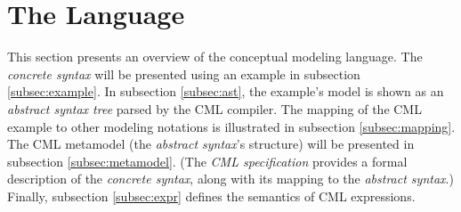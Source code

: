 \section{The Language}\label{sec:lang}
%
This section presents an overview of the conceptual modeling language.
The \emph{concrete syntax} will be presented using an example in subsection \ref{subsec:example}. 
In subsection \ref{subsec:ast},
the example's model is shown as an \emph{abstract syntax tree} parsed by the CML compiler.
The mapping of the CML example to other modeling notations is illustrated in subsection \ref{subsec:mapping}.
The CML metamodel (the \emph{abstract syntax}'s structure) will be presented in subsection \ref{subsec:metamodel}. 
(The \emph{CML specification} \cite{cml-spec} provides a formal description of the \emph{concrete syntax},
along with its mapping to the \emph{abstract syntax}.) Finally, subsection \ref{subsec:expr} defines the semantics of CML expressions.







